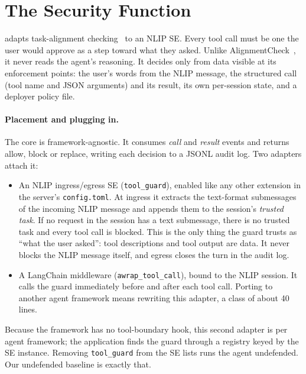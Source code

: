 \section{The Security Function}\label{sec:design}

\sys adapts task-alignment checking~\cite{taskshield,llamafirewall} to an NLIP SE. Every
tool call must be one the user would approve as a step toward what they asked. Unlike
AlignmentCheck~\cite{llamafirewall}, it never reads the agent's reasoning. It decides only
from data visible at its enforcement points: the user's words from the NLIP message, the
structured call (tool name and JSON arguments) and its result, its own per-session state, and
a deployer policy file.

\paragraph{Placement and plugging in.} The core is framework-agnostic. It consumes
\emph{call} and \emph{result} events and returns allow, block or replace, writing each
decision to a JSONL audit log. Two adapters attach it:
\begin{itemize}
\item An NLIP ingress/egress SE (\texttt{tool\_guard}), enabled like any other extension in
  the server's \texttt{config.toml}. At ingress it extracts the text-format submessages of the
  incoming NLIP message and appends them to the session's \emph{trusted task}. If no
  request in the session has a text submessage, there is no trusted task and every tool call
  is blocked. This is the only thing the
  guard trusts as ``what the user asked'': tool descriptions and tool output are data. It
  never blocks the NLIP message itself, and egress closes the turn in the audit log.
\item A LangChain middleware (\texttt{awrap\_tool\_call}), bound to the NLIP session. It
  calls the guard immediately before and after each tool call. Porting to another agent
  framework means rewriting this adapter, a class of about 40 lines.
\end{itemize}
Because the framework has no tool-boundary hook, this second adapter is per agent framework;
the application finds the guard through a registry keyed by the SE instance. Removing
\texttt{tool\_guard} from the SE lists runs the agent undefended. Our
undefended baseline is exactly that.

